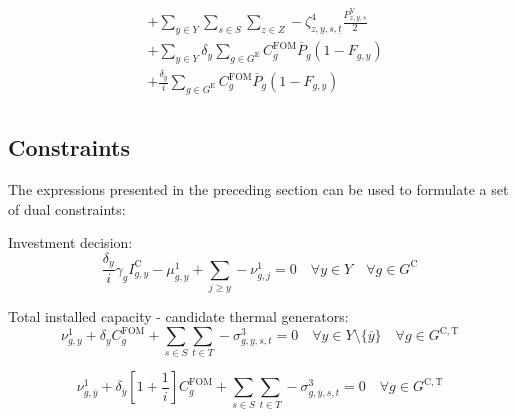\documentclass{article}
\newcommand{\sGeneratorsExisting}{G^{\mathrm{E}}}
\newcommand{\sGeneratorsCandidate}{G^{\mathrm{C}}}
\newcommand{\sGeneratorsCandidateThermal}{G^{\mathrm{C,T}}}
\newcommand{\sYears}{Y}
\newcommand{\sScenarios}{S}
\newcommand{\sIntervals}{T}
\newcommand{\sZones}{Z}
\newcommand{\iGenerator}{g}
\newcommand{\iYear}{y}
\newcommand{\iYearTerminal}{\overline{\iYear}}
\newcommand{\iYearAlias}{j}
\newcommand{\iScenario}{s}
\newcommand{\iInterval}{t}
\newcommand{\iIntervalStart}{\underline{\iInterval}}
\newcommand{\iZone}{z}
\newcommand{\cFixedOperationsMaintenanceCostGenerator}[1][\iGenerator]{C^{\mathrm{FOM}}_{#1}}
\newcommand{\cPowerOutputMax}[1][\iGenerator,\iYear]{\overline{P}_{#1}}
\newcommand{\cAmortisationRate}[1][\iGenerator]{\gamma_{#1}}
\newcommand{\cCandidateInvestmentCost}[1][\iGenerator,\iYear]{I^{\mathrm{C}}_{#1}}
\newcommand{\cInterestRate}{i}
\newcommand{\cRetirementIndicator}[1][\iGenerator,\iYear]{F_{#1}}
\newcommand{\cDiscountRate}[1][\iYear]{\delta_{#1}}
\newcommand{\cLostLoadPowerInitial}[1][\iZone,\iYear,\iScenario]{P_{#1}^{\mathrm{V}}}
\newcommand{\dNonNegativeCandidateCapacity}[1][\iGenerator,\iYear]{\mu_{#1}^{1}}
\newcommand{\dTotalInstallCapacity}[1][\iGenerator,\iYear]{\nu_{#1}^{1}}
\newcommand{\dMaxPowerOutputCandidateThermal}[1][\iGenerator,\iYear,\iScenario,\iInterval]{\sigma_{#1}^{3}}
\newcommand{\dLostLoadEnergy}[1][\iZone,\iYear,\iScenario,\iInterval]{\zeta_{#1}^{4}}
\begin{document}
\begin{align}
& + \sum\limits_{\iYear \in \sYears}\sum\limits_{\iScenario \in \sScenarios}\sum\limits_{\iZone \in \sZones} - \dLostLoadEnergy[\iZone, \iYear,\iScenario,\iIntervalStart] \frac{\cLostLoadPowerInitial}{2}\\
& + \sum\limits_{\iYear \in \sYears} \cDiscountRate \sum\limits_{\iGenerator \in \sGeneratorsExisting} \cFixedOperationsMaintenanceCostGenerator \cPowerOutputMax[\iGenerator] \left(1 - \cRetirementIndicator\right)\\
& + \frac{\cDiscountRate[\iYearTerminal]}{\cInterestRate} \sum\limits_{\iGenerator \in \sGeneratorsExisting} \cFixedOperationsMaintenanceCostGenerator \cPowerOutputMax[\iGenerator] \left(1 - \cRetirementIndicator\right)\\
\end{align}

\subsection{Constraints}
The expressions presented in the preceding section can be used to formulate a set of dual constraints:

Investment decision:
\begin{equation}
\frac{\cDiscountRate}{\cInterestRate} \cAmortisationRate \cCandidateInvestmentCost - \dNonNegativeCandidateCapacity + \sum\limits_{\iYearAlias \geq \iYear} -\dTotalInstallCapacity[\iGenerator,\iYearAlias] = 0 \quad \forall \iYear \in \sYears \quad \forall \iGenerator \in \sGeneratorsCandidate
\end{equation}

Total installed capacity - candidate thermal generators:
\begin{equation}
 \dTotalInstallCapacity + \cDiscountRate \cFixedOperationsMaintenanceCostGenerator + \sum\limits_{\iScenario \in \sScenarios}\sum\limits_{\iInterval \in \sIntervals} - \dMaxPowerOutputCandidateThermal = 0 \quad \forall \iYear \in \sYears \setminus \{\iYearTerminal\} \quad \forall \iGenerator \in \sGeneratorsCandidateThermal
\end{equation}

\begin{equation}
\dTotalInstallCapacity[\iGenerator,\iYearTerminal] + \cDiscountRate[\iYearTerminal] \left[1 + \frac{1}{\cInterestRate}\right] \cFixedOperationsMaintenanceCostGenerator + \sum\limits_{\iScenario \in \sScenarios}\sum\limits_{\iInterval \in \sIntervals} - \dMaxPowerOutputCandidateThermal[\iGenerator,\iYearTerminal,\iScenario,\iInterval] = 0 \quad \forall \iGenerator \in \sGeneratorsCandidateThermal
\end{equation}
\end{document}
